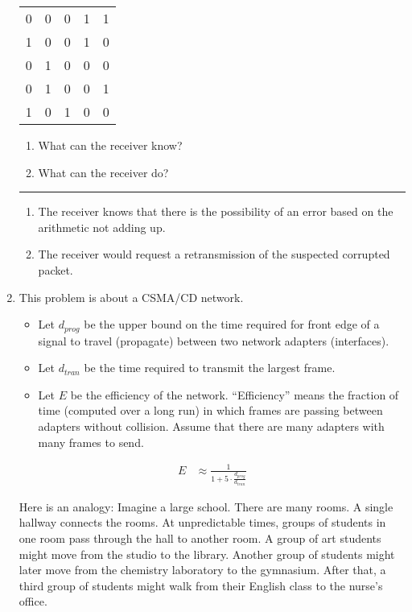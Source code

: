 \documentclass[twoside]{article}
\newenvironment{answer}
  {\vspace*{0.2cm} \rule{12cm}{0.04cm} \vspace*{0.2cm}}
  {\vspace*{0.2cm}}
\begin{document}
\begin{enumerate}
  \begin{tabular}{llll|l}
    0 & 0 & 0 & 1 & 1 \\
    1 & 0 & 0 & 1 & 0 \\
    0 & 1 & 0 & 0 & 0 \\
    0 & 1 & 0 & 0 & 1 \\ \hline
    1 & 0 & 1 & 0 & 0
    \end{tabular}

    \begin{enumerate}
      \item What can the receiver know?
      \item What can the receiver do?
      \end{enumerate}

  \begin{answer}

  \begin{enumerate}
    \item The receiver knows that there is the possibility of an error based on the arithmetic not adding up.
    \item The receiver would request a retransmission of the suspected corrupted packet.
    \end{enumerate}

    \end{answer}

  \item This problem is about a CSMA/CD network.
  \begin{itemize}
    \item Let $d_{prog}$ be the upper bound on the time required
      for front edge of a signal to travel (propagate) between two network adapters (interfaces).
    \item Let $d_{tran}$ be the time required to transmit the largest frame.
    \item Let $E$ be the efficiency of the network. ``Efficiency'' means the
      fraction of time (computed over a long run) in which frames are passing
      between adapters without collision. Assume that there are many adapters
      with many frames to send.
    \end{itemize}

  \begin{align*}
    E & \approx \frac{1}{1 + 5 \cdot \frac{d_{prog}}{d_{tran}}}
    \end{align*}

    Here is an analogy: Imagine a large school. There are many rooms.
    A single hallway connects the rooms. At unpredictable times, groups of students in
    one room pass through the hall to another room. A group of art
    students might move from the studio to the library. Another group of
    students might later move from the chemistry laboratory to the gymnasium.
    After that, a third group of students might walk from their English class to
    the nurse's office.


\end{enumerate}
\end{document}

